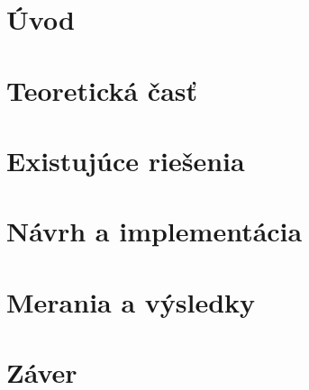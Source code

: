 \chapter{Úvod}


\chapter{Teoretická časť}






\chapter{Existujúce riešenia}


\chapter{Návrh a implementácia}







\chapter{Merania a výsledky}






\chapter{Záver}
